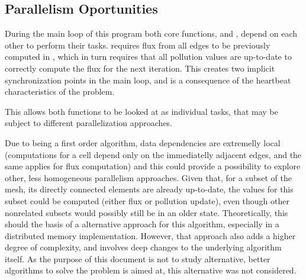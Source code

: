 \subsection{Parallelism Oportunities}
\label{sec:220}

During the main loop of this program both core functions, \computeflux and \update, depend on each other to perform their tasks. \update requires flux from all edges to be previously computed in \computeflux, which in turn requires that all pollution values are up-to-date to correctly compute the flux for the next iteration. This creates two implicit synchronization points in the main loop, and is a consequence of the heartbeat characteristics of the problem.

This allows both functions to be looked at as individual tasks, that may be subject to different parallelization approaches.

Due to being a first order algorithm, data dependencies are extremelly local (computations for a cell depend only on the immediatelly adjacent edges, and the same applies for flux computation) and this could provide a possibility to explore other, less homogeneous parallelism approaches. Given that, for a subset of the mesh, its directly connected elements are already up-to-date, the values for this subset could be computed (either flux or pollution update), even though other nonrelated subsets would possibly still be in an older state. Theoretically, this should the basis of a alternative approach for this algorithm, especially in a distributed memory implementation. However, that approach also adds a higher degree of complexity, and involves deep changes to the underlying algorithm itself. As the purpose of this document is not to study alternative, better algorithms to solve the problem \polu is aimed at, this alternative was not considered.
